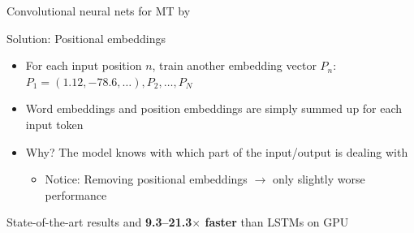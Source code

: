 \documentclass[12pt,aspectratio=169,handout]{beamer}
\begin{document}
\begin{frame}{Convolutional neural nets for MT by \citet{Gehring.et.al.2017a.ICML}}
	
	Solution: Positional embeddings
	
	\begin{itemize}
		\item For each input position $n$, train another embedding vector $P_n$: $P_1 = (1.12, -78.6, \dots), P_2, \dots, P_N$
		
		\item Word embeddings and position embeddings are simply summed up for each input token
		
		\item Why? The model knows with which part of the input/output is dealing with
		
		\begin{itemize}
			\item Notice: Removing positional embeddings $\to$ only slightly worse performance
		\end{itemize}
		
		
	\end{itemize}
	
	
	State-of-the-art results and \textbf{9.3--21.3$\times$ faster} than LSTMs on GPU
	
\end{frame}
\end{document}
